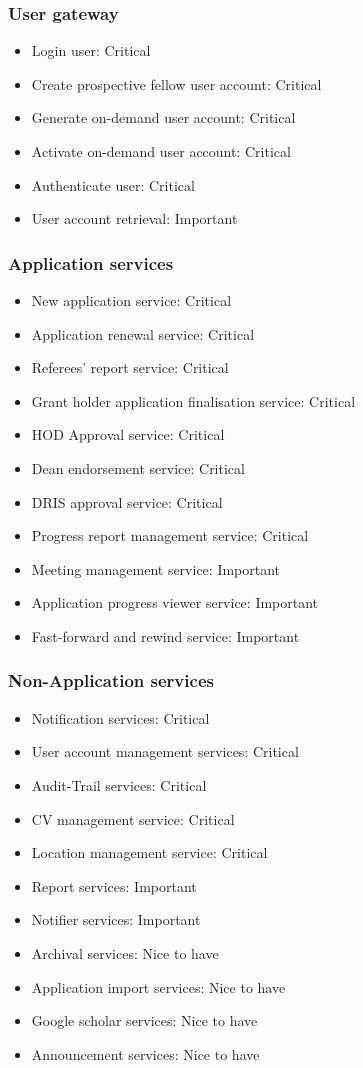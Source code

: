 \documentclass[12pt]{article}
\begin{document}
\subsubsection{User gateway}
\begin{itemize}
	\item Login user: Critical	
	\item Create prospective fellow user account: Critical
	\item Generate on-demand user account: Critical
	\item Activate on-demand user account: Critical
	\item Authenticate user: Critical
	\item User account retrieval: Important
\end{itemize}
\subsubsection{Application services}
\begin{itemize}
	\item New application service: Critical
	\item Application renewal service: Critical
	\item Referees' report service: Critical
	\item Grant holder application finalisation service: Critical
	\item HOD Approval service: Critical
	\item Dean endorsement service: Critical
	\item DRIS approval service: Critical
	\item Progress report management service: Critical		
	\item Meeting management service: Important
	\item Application progress viewer service: Important
	\item Fast-forward and rewind service: Important		
\end{itemize}

\subsubsection{Non-Application services}
\begin{itemize}
	\item Notification services: Critical
	\item User account management services: Critical
	\item Audit-Trail services: Critical
	\item CV management service: Critical
	\item Location management service: Critical
	\item Report services: Important
	\item Notifier services: Important
	\item Archival services: Nice to have
	\item Application import services: Nice to have
	\item Google scholar services: Nice to have
	\item Announcement services: Nice to have								
\end{itemize}
\end{document}
